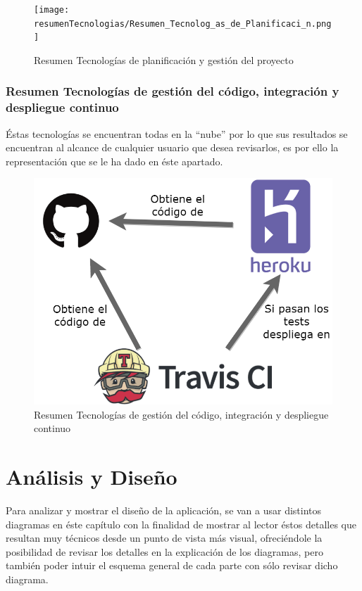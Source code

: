 \documentclass[11pt,openany]{book}
\begin{document}
\begin{figure}[H]
\centering
\texttt{[image: resumenTecnologias/Resumen\_Tecnolog\_as\_de\_Planificaci\_n.png]}
\caption{Resumen Tecnologías de planificación y gestión del proyecto}
\end{figure}

\subsection{Resumen Tecnologías de gestión del código, integración y despliegue continuo}

Éstas tecnologías se encuentran todas en la ``nube'' por lo que sus resultados se encuentran al alcance de cualquier usuario que desea revisarlos, es por ello la representación que se le ha dado en éste apartado.

\begin{figure}[H]
\centering
\includegraphics[totalheight=5cm]{resumenTecnologias/Resumen_Tecnolog_as_de_Integraciones.png}
\caption{Resumen Tecnologías de gestión del código, integración y despliegue continuo}
\end{figure}

\chapter{Análisis y Diseño}

Para analizar y mostrar el diseño de la aplicación, se van a usar distintos diagramas en éste capítulo con la finalidad de mostrar al lector éstos detalles que resultan muy técnicos desde un punto de vista más visual, ofreciéndole la posibilidad de revisar los detalles en la explicación de los diagramas, pero también poder intuir el esquema general de cada parte con sólo revisar dicho diagrama.
\end{document}
